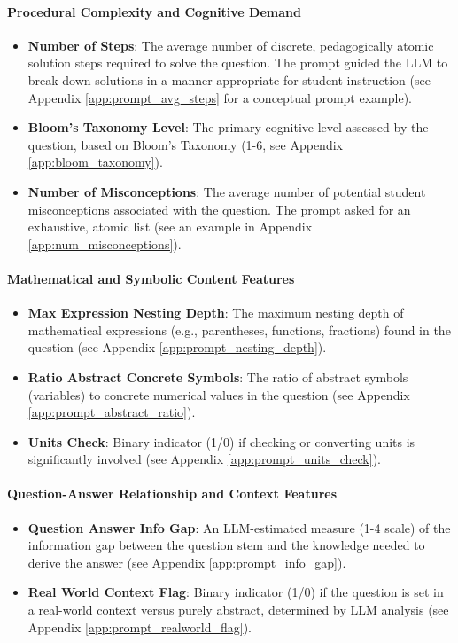 \documentclass[
    a4paper, %
    10pt, %
    twoside, %
]{LTJournalArticle}
\begin{document}
\paragraph{Procedural Complexity and Cognitive Demand}
\begin{itemize}
    \item \textbf{Number of Steps}: The average number of discrete, pedagogically atomic solution steps required to solve the question. The prompt guided the LLM to break down solutions in a manner appropriate for student instruction (see Appendix \ref{app:prompt_avg_steps} for a conceptual prompt example).
    \item \textbf{Bloom's Taxonomy Level}: The primary cognitive level assessed by the question, based on Bloom's Taxonomy (1-6, see Appendix \ref{app:bloom_taxonomy}).
    \item \textbf{Number of Misconceptions}: The average number of potential student misconceptions associated with the question. The prompt asked for an exhaustive, atomic list (see an example in Appendix \ref{app:num_misconceptions}).
\end{itemize}

\paragraph{Mathematical and Symbolic Content Features}
\begin{itemize}
    \item \textbf{Max Expression Nesting Depth}: The maximum nesting depth of mathematical expressions (e.g., parentheses, functions, fractions) found in the question (see Appendix \ref{app:prompt_nesting_depth}).
    \item \textbf{Ratio Abstract Concrete Symbols}: The ratio of abstract symbols (variables) to concrete numerical values in the question (see Appendix \ref{app:prompt_abstract_ratio}).
    \item \textbf{Units Check}: Binary indicator (1/0) if checking or converting units is significantly involved (see Appendix \ref{app:prompt_units_check}).
\end{itemize}

\paragraph{Question-Answer Relationship and Context Features}
\begin{itemize}
    \item \textbf{Question Answer Info Gap}: An LLM-estimated measure (1-4 scale) of the information gap between the question stem and the knowledge needed to derive the answer (see Appendix \ref{app:prompt_info_gap}).
    \item \textbf{Real World Context Flag}: Binary indicator (1/0) if the question is set in a real-world context versus purely abstract, determined by LLM analysis (see Appendix \ref{app:prompt_realworld_flag}).
\end{itemize}
\end{document}
